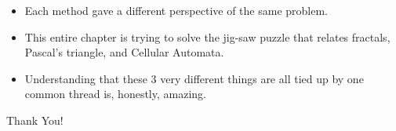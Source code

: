 \documentclass{beamer}
\begin{document}
\begin{frame}
    \begin{itemize}
        \item Each method gave a different perspective of the same problem.
        \item This entire chapter is trying to solve the jig-saw puzzle that relates fractals, Pascal's triangle, and Cellular Automata. 
        \item Understanding that these 3 very different things are all tied up by one common thread is, honestly, amazing.
    \end{itemize}
\end{frame}

\begin{frame}
    \centering 
    \Huge{Thank You!}
\end{frame}


\end{document}
